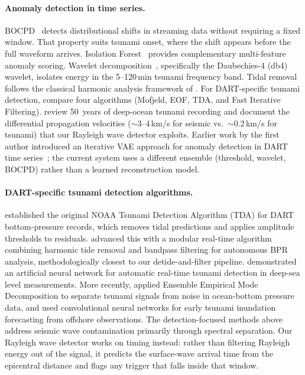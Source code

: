 \documentclass{article}
\begin{document}
\paragraph{Anomaly detection in time series.}
BOCPD~\citep{adams2007bayesian} detects distributional shifts in
streaming data without requiring a fixed window. That property suits
tsunami onset, where the shift appears before the full waveform
arrives. Isolation
Forest~\citep{liu2008isolation} provides complementary multi-feature
anomaly scoring. Wavelet decomposition~\citep{daubechies1992ten},
specifically the Daubechies-4 (db4) wavelet, isolates energy in the 5--120\,min
tsunami frequency band. Tidal removal
follows the classical harmonic analysis framework of
\citet{pawlowicz2002classical}. For DART-specific tsunami detection,
\citet{angeli2025tsunami} compare four algorithms (Mofjeld, EOF,
TDA, and Fast Iterative Filtering).
\citet{rabinovich2015deep} review 50~years of deep-ocean tsunami
recording and document the differential propagation velocities
($\sim$3--4\,km/s for seismic vs.\ $\sim$0.2\,km/s for tsunami) that our
Rayleigh wave detector exploits. Earlier work by the first author
introduced an iterative VAE approach for anomaly detection in DART
time series~\citep{lee2024vae}; the current system uses a different
ensemble (threshold, wavelet, BOCPD) rather than a learned
reconstruction model.

\paragraph{DART-specific tsunami detection algorithms.}
\citet{mofjeld1997tsunami} established the original NOAA Tsunami
Detection Algorithm (TDA) for DART bottom-pressure records, which
removes tidal predictions and applies amplitude thresholds to
residuals. \citet{chierici2017new} advanced this with a modular
real-time algorithm combining harmonic tide removal and bandpass
filtering for autonomous BPR analysis, methodologically closest to
our detide-and-filter pipeline. \citet{beltrami2008ann} demonstrated
an artificial neural network for automatic real-time tsunami detection
in deep-sea level measurements. More recently,
\citet{wang2020realtime} applied Ensemble Empirical Mode Decomposition
to separate tsunami signals from noise in ocean-bottom pressure data,
and \citet{makinoshima2021early} used convolutional neural networks for
early tsunami inundation forecasting from offshore observations. The
detection-focused methods above address seismic wave contamination
primarily through spectral separation. Our Rayleigh wave detector works on timing instead: rather than
filtering Rayleigh energy out of the signal, it predicts the
surface-wave arrival time from the epicentral distance and flags any
trigger that falls inside that window.
\end{document}
